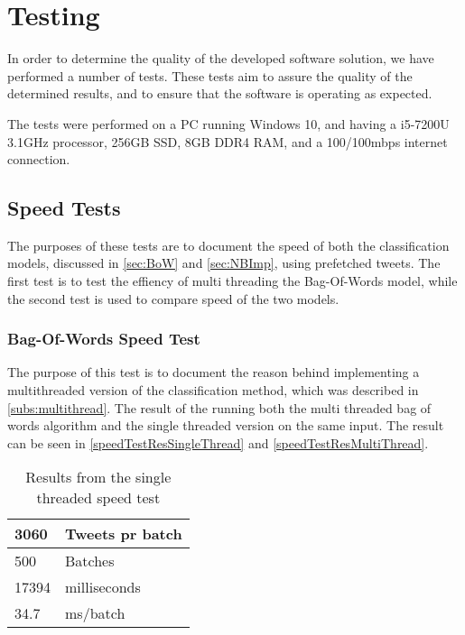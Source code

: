 \chapter{Testing}\label{cha:testing}
In order to determine the quality of the developed software solution, we have
performed a number of tests. These tests aim to assure the quality of the
determined results, and to ensure that the software is operating as
expected.\nl

The tests were performed on a PC running Windows 10, and having a i5-7200U
3.1GHz processor, 256GB SSD, 8GB DDR4 RAM, and a 100/100mbps internet
connection.

\section{Speed Tests}\label{speedtestlavel}
The purposes of these tests are to document the speed of both the
classification models, discussed in \autoref{sec:BoW} and
\autoref{sec:NBImp}, using prefetched tweets. The first test is to test the
effiency of multi threading the Bag-Of-Words model, while the second test is
used to compare speed of the two models.

\subsection{Bag-Of-Words Speed Test}\label{test:multithread}
The purpose of this test is to document the reason behind implementing a
multithreaded version of the classification method, which was described in
\autoref{subs:multithread}. 
The result of the running both the multi threaded bag of words algorithm and the
single threaded version on the same input. The result can be seen in
\autoref{speedTestResSingleThread} and \autoref{speedTestResMultiThread}.

\begin{table}[H]\centering
\begin{tabular}{|l|l|}
\hline
3060	&	Tweets pr batch 	\\\hline
500		&	Batches				\\\hline
17394	&	milliseconds		\\\hline
34.7	&	ms/batch 			\\\hline
\end{tabular}
\caption{Results from the single threaded speed test}
\label{speedTestResSingleThread}
\end{table}

